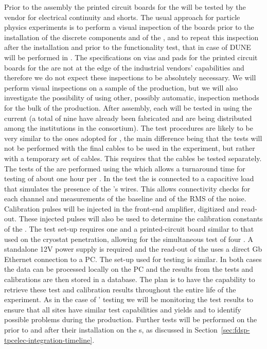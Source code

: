 Prior to the assembly the printed circuit boards for the
 will be tested by the vendor for electrical
continuity and shorts. The usual approach for particle physics
experiments is to perform a visual inspection of the boards
prior to the installation of the discrete components and of
the , and to repeat this inspection after the
installation and prior to the functionality test, that in
case of DUNE will be performed in \lntwo. The
specifications on vias and pads for the printed circuit
boards for the  are not at the edge of the
industrial vendors' capabilities and therefore we do not
expect these inspections to be absolutely necessary. We will
perform visual inspections on a sample of the 
production, but we will also investigate the possibility
of using other, possibly automatic, inspection methods for
the bulk of the production. After assembly, 
each  will be tested in \lntwo using
the current  (a total of nine have already been
fabricated and are being distributed among the institutions
in the consortium). The test procedures are likely to be
very similar to the ones adopted for , the main
difference being that the tests will not be performed with
the final cables to be used in the experiment, but rather
with a temporary set of cables. This requires that the 
cables be tested separately. The tests of the 
are performed using the  which allows a turnaround
time for testing of about one hour per . In the
test the  is connected to a capacitive load that
simulates the presence of the 's wires. This allows
connectivity checks for each channel and measurements of
the baseline and of the RMS of the noise. Calibration 
pulses will be injected in the front-end amplifier, digitized
and read-out. These injected pulses will also be used
to determine the calibration constants of the . 
The test set-up requires one  and
a printed-circuit board similar to that used on the cryostat
penetration, allowing for the simultaneous test of four .
A standalone 12V power supply is required and the read-out
of the  uses a direct Gb Ethernet connection to
a PC. The set-up used for  testing is similar.
In both cases the data can be processed locally on the PC
and the results from the tests and calibrations are then stored 
in a database. The plan is to have the capability to retrieve  
these test and calibration results throughout the entire life
of the experiment. As in the case of ' testing
we will be monitoring the test results to ensure that all
sites have similar test capabilities and yields and to
identify possible problems during the production.
Further tests will be performed on the 
prior to and after their installation on the s, as
discussed in Section~\ref{sec:fdsp-tpcelec-integration-timeline}.

